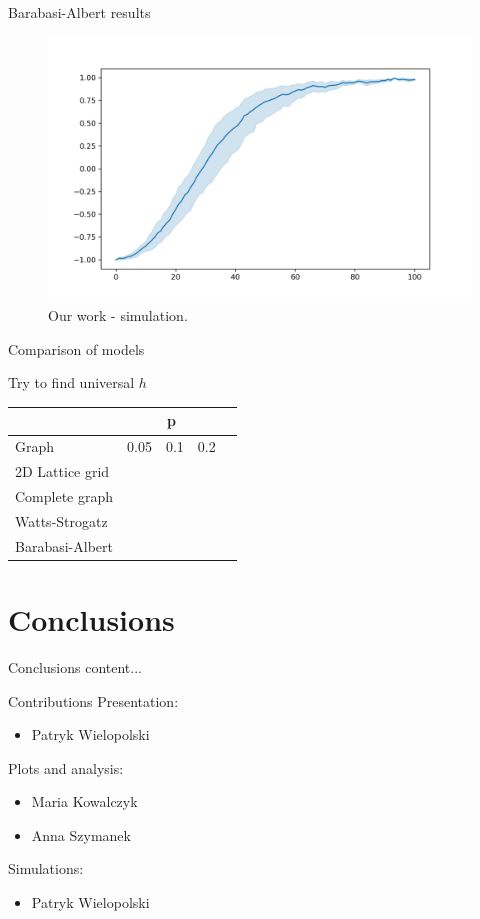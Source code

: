 \documentclass[10pt]{beamer}
\begin{document}
\begin{frame}{Barabasi-Albert results}
	\begin{figure}
		\includegraphics[width=\textwidth]{../results/images/example.png}
		\caption{Our work - simulation.}
	\end{figure}
\end{frame}

\begin{frame}{Comparison of models}
	
	Try to find universal $h$
	\begin{table}[]
		\begin{tabular}{l|llll}
			& \multicolumn{3}{c}{p} &  \\
			\hline
			Graph           & 0.05   & 0.1   & 0.2  &  \\
			\hline
			2D Lattice grid &        &       &      &  \\
			Complete graph  &        &       &      &  \\
			Watts-Strogatz  &        &       &      &  \\
			Barabasi-Albert &        &       &      & 
		\end{tabular}
	\end{table}
\end{frame}

\section{Conclusions}

\begin{frame}{Conclusions}
	content...
\end{frame}

\begin{frame}{Contributions}
	Presentation:
	\begin{itemize}
		\item Patryk Wielopolski
	\end{itemize}
	Plots and analysis:
	\begin{itemize}
		\item Maria Kowalczyk
		\item Anna Szymanek
	\end{itemize}
	Simulations:
	\begin{itemize}
		\item Patryk Wielopolski
	\end{itemize}
\end{frame}
\end{document}
